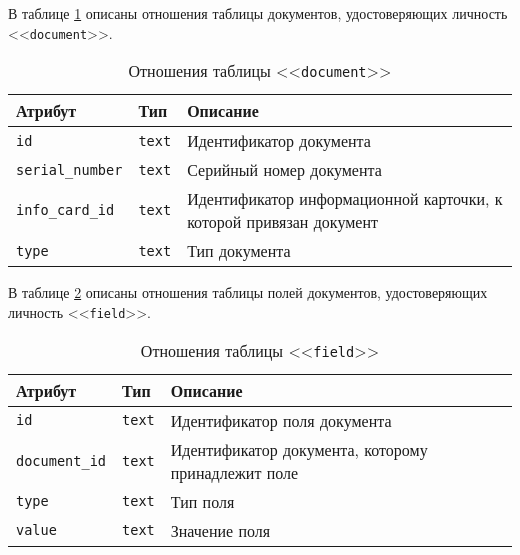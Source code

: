\clearpage

В таблице \ref{table:documentCols} описаны отношения таблицы документов, удостоверяющих личность <<\texttt{document}>>.
\begin{table}[h!]
	\begin{center}
		\caption{\label{table:documentCols} Отношения таблицы <<\texttt{document}>>}
		\begin{tabularx}{\textwidth}{|X|X|X|}
			\hline
			Атрибут & Тип & Описание \\ \hline
			\texttt{id} & \texttt{text} & Идентификатор документа \\ \hline
			\texttt{serial\_number} & \texttt{text} & Серийный номер документа \\ \hline
			\texttt{info\_card\_id} & \texttt{text} & Идентификатор информационной карточки, к которой привязан документ \\ \hline
			\texttt{type} & \texttt{text} & Тип документа \\ \hline
		\end{tabularx}
	\end{center}
\end{table}

В таблице \ref{table:fieldCols} описаны отношения таблицы полей документов, удостоверяющих личность <<\texttt{field}>>.
\begin{table}[h!]
	\begin{center}
		\caption{\label{table:fieldCols} Отношения таблицы <<\texttt{field}>>}
		\begin{tabularx}{\textwidth}{|X|X|X|}
			\hline
			Атрибут & Тип & Описание \\ \hline
			\texttt{id} & \texttt{text} & Идентификатор поля документа \\ \hline
			\texttt{document\_id} & \texttt{text} & Идентификатор документа, которому принадлежит поле \\ \hline
			\texttt{type} & \texttt{text} & Тип поля \\ \hline
			\texttt{value} & \texttt{text} & Значение поля \\ \hline
		\end{tabularx}
	\end{center}
\end{table}

\clearpage

